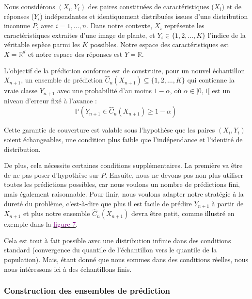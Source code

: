 \documentclass[a4paper,12pt]{article}
\begin{document}
Nous considérons $(X_i, Y_i)$ des paires constituées de caractéristiques ($X_i$) et de réponses ($Y_i$) indépendantes et identiquement distribuées issues d'une distribution inconnue $P$, avec $i = 1, \dots, n$. Dans notre contexte, $X_i$ représente les caractéristiques extraites d'une image de plante, et $Y_i \in \{1, 2, \dots, K\}$ l'indice de la véritable espèce parmi les $K$ possibles. Notre espace des caractéristiques est $X = \mathbb R^d$ et notre espace des réponses est $Y = \mathbb R$.

\vspace{0.2cm}

L'objectif de la prédiction conforme est de construire, pour un nouvel échantillon $X_{n+1}$, un ensemble de prédiction $\hat{C}_n(X_{n+1}) \subseteq \{1, 2, \dots, K\}$ qui contienne la vraie classe $Y_{n+1}$ avec une probabilité d'au moins $1 - \alpha$, où $\alpha \in ]0,1[$ est un niveau d'erreur fixé à l'avance : 
$$ \mathbb P(Y_{n+1} \in \hat C_n (X_{n+1}) \geq 1 - \alpha) $$

\vspace{0.2cm}

Cette garantie de couverture est valable sous l'hypothèse que les paires $(X_i, Y_i)$ soient échangeables, une condition plus faible que l'indépendance et l'identité de distribution.

\vspace{0.2cm}

De plus, cela nécessite certaines conditions supplémentaires. La première va être de ne pas poser d'hypothèse sur $P$. Ensuite, nous ne devons pas non plus utiliser toutes les prédictions possibles, car nous voulons un nombre de prédictions fini, mais également raisonnable. Pour finir, nous voulons adapter notre stratégie à la dureté du problème, c'est-à-dire que plus il est facile de prédire $Y_{n+1}$ à partir de $X_{n+1}$ et plus notre ensemble $\hat C_n(X_{n+1})$ devra être petit, comme illustré en exemple dans la \hyperref[fig:prediction_sets]{\textcolor{purple}{figure 7}}.

\vspace{0.2cm}

Cela est tout à fait possible avec une distribution infinie dans des conditions standard (convergence du quantile de l'échantillon vers le quantile de la population). Mais, étant donné que nous sommes dans des conditions réelles, nous nous intéressons ici à des échantillons finis.

\subsubsection{Construction des ensembles de prédiction}
\end{document}
